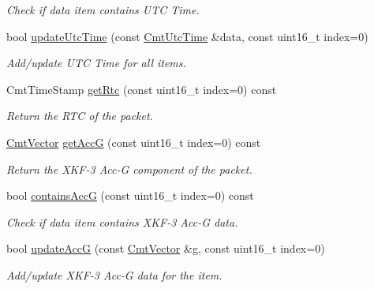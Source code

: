 \begin{DoxyCompactItemize}
\begin{DoxyCompactList}\small\item\em \-Check if data item contains \-U\-T\-C \-Time. \end{DoxyCompactList}\item 
\hypertarget{classxsens_1_1Packet_affdc1a4225a650e5ccdfee80a2ae1480}{bool \hyperlink{classxsens_1_1Packet_affdc1a4225a650e5ccdfee80a2ae1480}{update\-Utc\-Time} (const \hyperlink{structCmtUtcTime}{\-Cmt\-Utc\-Time} \&data, const uint16\-\_\-t index=0)}\label{classxsens_1_1Packet_affdc1a4225a650e5ccdfee80a2ae1480}

\begin{DoxyCompactList}\small\item\em \-Add/update \-U\-T\-C \-Time for all items. \end{DoxyCompactList}\item 
\-Cmt\-Time\-Stamp \hyperlink{classxsens_1_1Packet_a4ef0f7eccc7bf205e3ae895c81715041}{get\-Rtc} (const uint16\-\_\-t index=0) const 
\begin{DoxyCompactList}\small\item\em \-Return the \-R\-T\-C of the packet. \end{DoxyCompactList}\item 
\hyperlink{structCmtVector}{\-Cmt\-Vector} \hyperlink{classxsens_1_1Packet_ab8f32ca2c2ca2817e105de286de4361c}{get\-Acc\-G} (const uint16\-\_\-t index=0) const 
\begin{DoxyCompactList}\small\item\em \-Return the \-X\-K\-F-\/3 \-Acc-\/\-G component of the packet. \end{DoxyCompactList}\item 
\hypertarget{classxsens_1_1Packet_ab9e2b2c01868c4350cfb7776c4ae5288}{bool \hyperlink{classxsens_1_1Packet_ab9e2b2c01868c4350cfb7776c4ae5288}{contains\-Acc\-G} (const uint16\-\_\-t index=0) const }\label{classxsens_1_1Packet_ab9e2b2c01868c4350cfb7776c4ae5288}

\begin{DoxyCompactList}\small\item\em \-Check if data item contains \-X\-K\-F-\/3 \-Acc-\/\-G data. \end{DoxyCompactList}\item 
\hypertarget{classxsens_1_1Packet_a6daa518d4d988c0087449b0217961d0b}{bool \hyperlink{classxsens_1_1Packet_a6daa518d4d988c0087449b0217961d0b}{update\-Acc\-G} (const \hyperlink{structCmtVector}{\-Cmt\-Vector} \&g, const uint16\-\_\-t index=0)}\label{classxsens_1_1Packet_a6daa518d4d988c0087449b0217961d0b}

\begin{DoxyCompactList}\small\item\em \-Add/update \-X\-K\-F-\/3 \-Acc-\/\-G data for the item. \end{DoxyCompactList}\end{DoxyCompactItemize}
